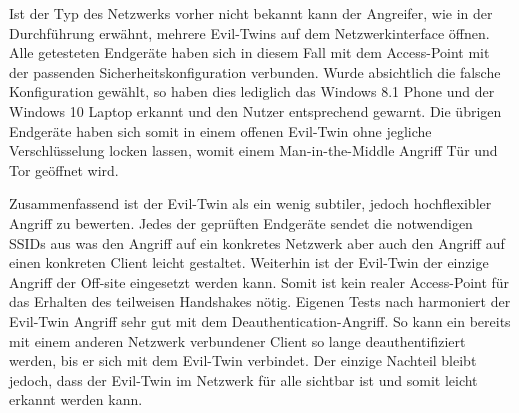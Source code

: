 Ist der Typ des Netzwerks vorher nicht bekannt kann der Angreifer, wie in der Durchführung erwähnt, mehrere Evil-Twins auf dem Netzwerkinterface öffnen.
Alle getesteten Endgeräte haben sich in diesem Fall mit dem Access-Point mit der passenden Sicherheitskonfiguration verbunden.
Wurde absichtlich die falsche Konfiguration gewählt, so haben dies lediglich das Windows 8.1 Phone und der Windows 10 Laptop erkannt und den Nutzer entsprechend gewarnt. %
Die übrigen Endgeräte haben sich somit in einem offenen Evil-Twin ohne jegliche Verschlüsselung locken lassen, womit einem Man-in-the-Middle Angriff Tür und Tor geöffnet wird.

Zusammenfassend ist der Evil-Twin als ein wenig subtiler, jedoch hochflexibler Angriff zu bewerten.
Jedes der geprüften Endgeräte sendet die notwendigen SSIDs aus was den Angriff auf ein konkretes Netzwerk aber auch den Angriff auf einen konkreten Client leicht gestaltet.
Weiterhin ist der Evil-Twin der einzige Angriff der Off-site eingesetzt werden kann. 
Somit ist kein realer Access-Point für das Erhalten des teilweisen Handshakes nötig.
Eigenen Tests nach harmoniert der Evil-Twin Angriff sehr gut mit dem Deauthentication-Angriff.
So kann ein bereits mit einem anderen Netzwerk verbundener Client so lange deauthentifiziert werden, bis er sich mit dem Evil-Twin verbindet.
Der einzige Nachteil bleibt jedoch, dass der Evil-Twin im Netzwerk für alle sichtbar ist und somit leicht erkannt werden kann.



